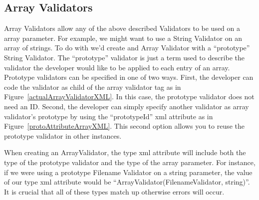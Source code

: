 \subsection{Array Validators}
Array Validators allow any of the above described Validators to be used on a array parameter. For example, we might want to use a
String Validator on an array of strings. To do with we'd create and Array Validator with a ``prototype'' String Validator. The 
``prototype'' validator is just a term used to describe the validator the developer would like to be applied to each entry of an
array. Prototype validators can be specified in one of two ways. First, the developer can code the validator as child of the array validator
tag as in Figure~\ref{actualArrayValidatorXML}. In this case, the prototype validator does not need an ID. 
Second, the developer can simply specify another validator as array validator's  prototype by using the
``prototypeId'' xml attribute as in Figure~\ref{protoAttributeArrayXML}. This second option allows you to reuse the prototype validator in other instances.

When creating an ArrayValidator, the type xml attribute will include both the type of the prototype validator and the type of the array
parameter. For instance, if we were using a prototype Filename Validator on a string parameter, the value of our type xml attribute would
be ``ArrayValidator(FilenameValidator, string)''. It is crucial that all of these types match up otherwise errors will occur.


